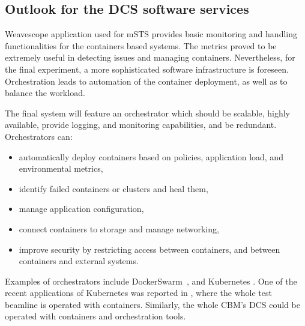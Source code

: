 \subsection{Outlook for the DCS software services} 

Weavescope application used for \gls{mSTS} provides basic monitoring and handling functionalities for the containers based systems. The metrics proved to be extremely useful in detecting issues and managing containers. Nevertheless, for the final experiment, a more sophisticated software infrastructure is foreseen.  Orchestration leads to automation of the container deployment, as well as to balance the workload.

The final system will feature an orchestrator which should be scalable, highly available, provide logging, and monitoring capabilities, and be redundant. Orchestrators can:
 \begin{itemize}
     \item automatically deploy containers based on policies, application load, and environmental metrics,
     \item identify failed containers or clusters and heal them,
     \item manage application configuration,
     \item connect containers to storage and manage networking,
     \item improve security by restricting access between containers, and between containers and external systems.
 \end{itemize}

 Examples of orchestrators include DockerSwarm~\cite{DockerSwarm}, and Kubernetes \cite{Kubernetes}. One of the recent applications of Kubernetes was reported in \cite{ICALEPCS2021:Diamond}, where the whole test beamline is operated with containers. Similarly, the whole \gls{CBM}'s \gls{DCS} could be operated with containers and orchestration tools. 


